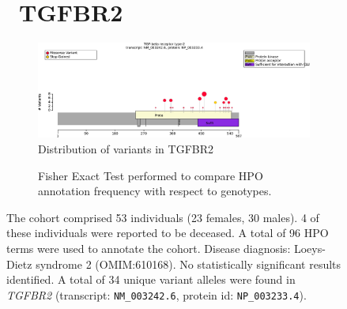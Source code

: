 \begin{figure}[htbp]
\section*{ TGFBR2}
\centering
\begin{subfigure}[b]{0.95\textwidth}
\centering
\includegraphics[width=\textwidth]{ img/TGFBR2_protein_diagram.pdf} 
\captionsetup{justification=raggedright,singlelinecheck=false}
\caption{Distribution of variants in TGFBR2}
\end{subfigure}

\vspace{2em}

\begin{subfigure}[b]{0.95\textwidth}
\centering
{}
\captionsetup{justification=raggedright,singlelinecheck=false}
\caption{Fisher Exact Test performed to compare HPO annotation frequency with respect to genotypes.}
\end{subfigure}

\vspace{2em}

\caption{The cohort comprised 53 individuals (23 females, 30 males). 4 of these individuals were reported to be deceased. A total of 96 HPO terms were used to annotate the cohort. Disease diagnosis: Loeys-Dietz syndrome 2 (OMIM:610168). No statistically significant results identified. A total of 34 unique variant alleles were found in \textit{TGFBR2} (transcript: \texttt{NM\_003242.6}, protein id: \texttt{NP\_003233.4}).}
\end{figure}
